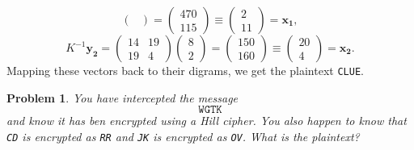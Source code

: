 \documentclass[12pt]{article}
\newenvironment{answer}
    {\begin{adjustwidth}{0pt}{0pt}}
    {\end{adjustwidth}}
\newtheorem{problem}{Problem}
\theoremstyle{remark}  %
\begin{document}
\begin{answer}
$$\begin{pmatrix}
            \end{pmatrix} = 
            \begin{pmatrix}
                470 \\
                115
            \end{pmatrix} \equiv
            \begin{pmatrix}
                2 \\
                11
            \end{pmatrix} = \mathbf{x_1}, $$$$ K^{-1}\mathbf{y_2} = 
            \begin{pmatrix}
                14 & 19 \\
                19 & 4
            \end{pmatrix}
            \begin{pmatrix}
                8 \\
                2
            \end{pmatrix} = 
            \begin{pmatrix}
                150 \\
                160
            \end{pmatrix} \equiv
            \begin{pmatrix}
                20 \\
                4   
            \end{pmatrix} = \mathbf{x_2}
            .$$ Mapping these vectors back to their digrams, we get the plaintext \texttt{CLUE}.
    \end{answer}
\vspace{5pt}
    \begin{problem}
        You have intercepted the message $$\texttt{WGTK}$$ and know it has ben encrypted using a Hill cipher. You also happen to know that \texttt{CD} is encrypted as \texttt{RR} and \texttt{JK} is encrypted as \texttt{OV}. What is the plaintext? 
    \end{problem}
\end{document}
